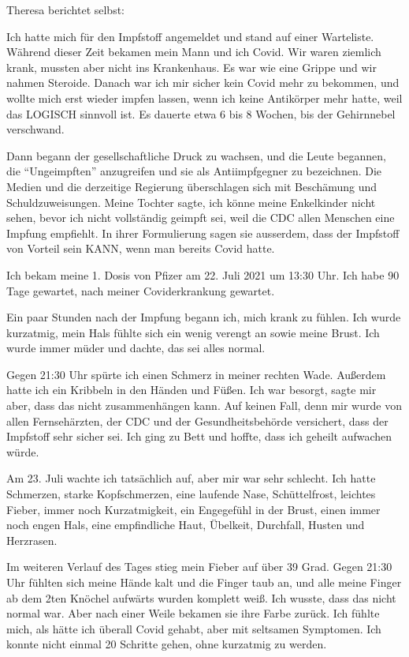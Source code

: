 Theresa berichtet selbst:

Ich hatte mich für den Impfstoff angemeldet und stand auf einer
Warteliste. Während dieser Zeit bekamen mein Mann und ich Covid. Wir waren
ziemlich krank, mussten aber nicht ins Krankenhaus. Es war wie eine Grippe und
wir nahmen Steroide. Danach war ich mir sicher kein Covid mehr zu bekommen, und
wollte mich erst wieder impfen lassen, wenn ich keine Antikörper mehr hatte,
weil das LOGISCH sinnvoll ist. Es dauerte etwa 6 bis 8 Wochen, bis der
Gehirnnebel verschwand.

Dann begann der gesellschaftliche Druck zu wachsen, und die Leute begannen, die
``Ungeimpften'' anzugreifen und sie als Antiimpfgegner zu bezeichnen. Die Medien
und die derzeitige Regierung überschlagen sich mit Beschämung und
Schuldzuweisungen. Meine Tochter sagte, ich könne meine Enkelkinder nicht sehen,
bevor ich nicht vollständig geimpft sei, weil die CDC allen Menschen eine
Impfung empfiehlt. In ihrer Formulierung sagen sie ausserdem, dass der Impfstoff
von Vorteil sein KANN, wenn man bereits Covid hatte.

Ich bekam meine 1. Dosis von Pfizer am 22. Juli 2021 um 13:30 Uhr. Ich habe 90
Tage gewartet, nach meiner Coviderkrankung gewartet.

Ein paar Stunden nach der Impfung begann ich, mich krank zu fühlen. Ich wurde
kurzatmig, mein Hals fühlte sich ein wenig verengt an sowie meine Brust. Ich
wurde immer müder und dachte, das sei alles normal.

Gegen 21:30 Uhr spürte ich einen Schmerz in meiner rechten Wade. Außerdem hatte
ich ein Kribbeln in den Händen und Füßen. Ich war besorgt, sagte mir aber, dass
das nicht zusammenhängen kann. Auf keinen Fall, denn mir wurde von allen
Fernsehärzten, der CDC und der Gesundheitsbehörde versichert, dass der Impfstoff
sehr sicher sei. Ich ging zu Bett und hoffte, dass ich geheilt aufwachen würde.

Am 23. Juli wachte ich tatsächlich auf, aber mir war sehr schlecht. Ich hatte
Schmerzen, starke Kopfschmerzen, eine laufende Nase, Schüttelfrost, leichtes
Fieber, immer noch Kurzatmigkeit, ein Engegefühl in der Brust, einen immer noch
engen Hals, eine empfindliche Haut, Übelkeit, Durchfall, Husten und Herzrasen.

Im weiteren Verlauf des Tages stieg mein Fieber auf über 39 Grad. Gegen 21:30
Uhr fühlten sich meine Hände kalt und die Finger taub an, und alle meine Finger
ab dem 2ten Knöchel aufwärts wurden komplett weiß. Ich wusste, dass das nicht
normal war. Aber nach einer Weile bekamen sie ihre Farbe zurück. Ich fühlte
mich, als hätte ich überall Covid gehabt, aber mit seltsamen Symptomen. Ich
konnte nicht einmal 20 Schritte gehen, ohne kurzatmig zu werden.

